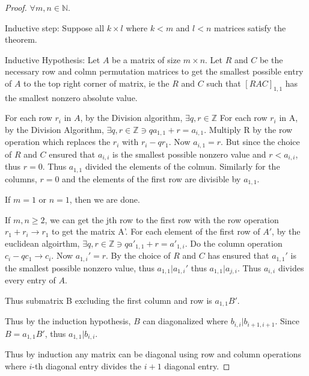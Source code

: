 \documentclass{article}
\newcommand{\Z}{\mathbb{Z}}
\newcommand{\N}{\mathbb{N}}
\begin{document}
\begin{proof}
    $\forall m , n \in \N$.  
    
    Inductive step: Suppose all $k \times l$ where $k < m$ and $l < n$ matrices satisfy the theorem. 

    Inductive Hypothesis: Let $A$ be a matrix of size $m \times n$. Let $R$ and $C$ be the necessary row and colmn permutation matrices to get the smallest possible entry of $A$ to the top right corner of matrix, ie the $R$ and $C$ such that $[RAC]_{1, 1}$ has the smallest nonzero absolute value.
    
    For each row $r_i$ in $A$, by the Division algorithm, $\exists q, r \in \Z$    
    For each row $r_i$ in A, by the Division Algorithm, $\exists q, r \in \Z \ni qa_{1, 1} + r = a_{i, 1}$. Multiply R by the row operation which replaces the $r_i$ with $r_i - qr_1$. Now $a_{i, 1} = r$. But since the choice of $R$ and $C$ ensured that $a_{i, i}$ is the smallest possible nonzero value and $r < a_{i, i}$, thus $r = 0$. Thus $a_{1, 1}$ divided the elements of the colmun. Similarly for the columns, $r = 0$ and the elements of the first row are divisible by $a_{1, 1}$.  

    If $m = 1$ or $n = 1$, then we are done.
    
    
    If $m, n \geq 2$, we can get the jth row to the first row with the row operation $r_1 + r_i \to r_1$ to get the matrix A'. For each element of the first row of $A'$, by the euclidean algoirthm, $\exists q, r \in \Z \ni qa'_{1, 1} + r = a'_{1, i}$. Do the column operation $c_i - qc_1 \to c_i$. Now $a_{1, i}' = r$. By the choice of $R$ and $C$ has ensured that $a_{1, 1}'$ is the smallest possible nonzero value, thus $a_{1, 1} | a_{1, i}'$ thus $a_{1, 1} | a_{j, i}$. Thus $a_{i, i}$ divides every entry of $A$. 
    
    Thus submatrix B excluding the first column and row is $a_{1, 1}B'$. 
    
    Thus by the induction hypothesis, $B$ can diagonalized where $b_{i, i} | b_{i + 1, i+ 1}$. Since $B = a_{1, 1}B'$, thus $a_{1, 1} | b_{i, i}$.


    Thus by induction any matrix can be diagonal using row and column operations where $i$-th diagonal entry divides the $i + 1$ diagonal entry.   
\end{proof}
\end{document}
